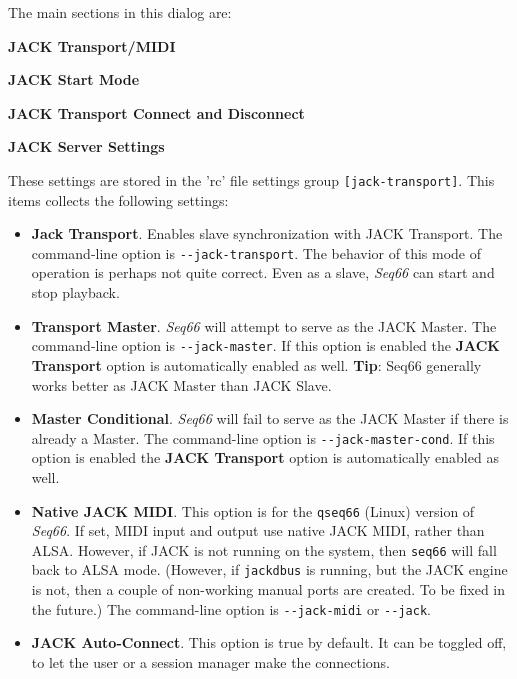    The main sections in this dialog are:

   \begin{enumber}
      \item \textbf{JACK Transport/MIDI}
      \item \textbf{JACK Start Mode}
      \item \textbf{JACK Transport Connect and Disconnect}
      \item \textbf{JACK Server Settings}
   \end{enumber}

   \setcounter{ItemCounter}{0}      %

   These settings are stored in the 'rc' file settings group
   \texttt{[jack-transport]}.
   This items collects the following settings:

   \begin{itemize}
      \item \textbf{Jack Transport}.
         Enables slave synchronization with JACK Transport.
         The command-line option is \texttt{-{}-jack-transport}.
         The behavior of this mode of operation is perhaps not quite
         correct.  Even as a slave, \textsl{Seq66} can start and
         stop playback.
      \item \textbf{Transport Master}.
         \textsl{Seq66} will attempt to serve as the JACK Master.
         The command-line option is \texttt{-{}-jack-master}.
         If this option is enabled the \textbf{JACK Transport} option is
         automatically enabled as well.
         \textbf{Tip}:
         Seq66 generally works better as JACK Master than JACK Slave.
      \item \textbf{Master Conditional}.
         \textsl{Seq66} will fail to serve as the JACK Master if there is
         already a Master.
         The command-line option is \texttt{-{}-jack-master-cond}.
         If this option is enabled the \textbf{JACK Transport} option is
         automatically enabled as well.
      \item \textbf{Native JACK MIDI}.
         This option is for the \texttt{qseq66} (Linux) version of
         \textsl{Seq66}.
         If set, MIDI input and output use native JACK MIDI,
         rather than ALSA.  However, if JACK is not running on the
         system, then \texttt{seq66} will fall back to ALSA mode.
         (However, if \texttt{jackdbus} is running, but the JACK engine is not,
         then a couple of non-working manual ports are created.  To be fixed in
         the future.)
         The command-line option is \texttt{-{}-jack-midi}
         or \texttt{-{}-jack}.
      \item \textbf{JACK Auto-Connect}.
         This option is true by default.
         It can be toggled off, to let the user
         or a session manager make the connections.
   \end{itemize}

